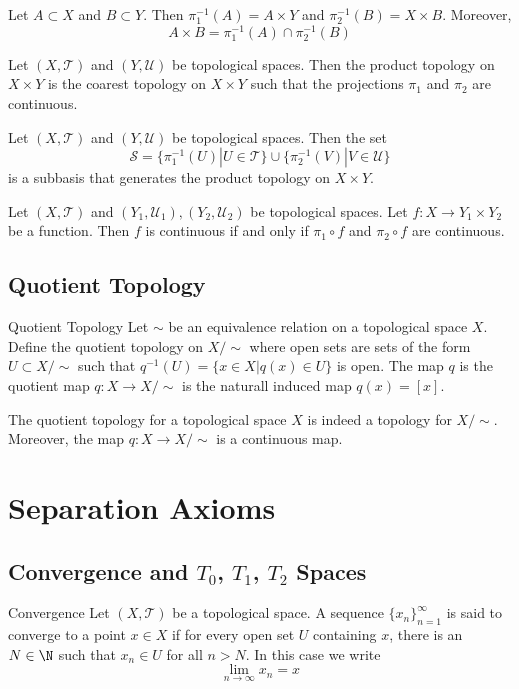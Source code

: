\begin{prp}{}{} Let $A\subset X$ and $B\subset Y$. Then $\pi_1^{-1}(A)=A\times Y$ and $\pi_2^{-1}(B)=X\times B$. Moreover, $$A\times B=\pi_1^{-1}(A)\cap\pi_2^{-1}(B)$$
\end{prp}

\begin{prp}{}{} Let $(X,\mathcal{T})$ and $(Y,\mathcal{U})$ be topological spaces. Then the product topology on $X\times Y$ is the coarest topology on $X\times Y$ such that the projections $\pi_1$ and $\pi_2$ are continuous. 
\end{prp}

\begin{prp}{}{} Let $(X,\mathcal{T})$ and $(Y,\mathcal{U})$ be topological spaces. Then the set $$\mathcal{S}=\{\pi_1^{-1}(U)|U\in\mathcal{T}\}\cup\{\pi_2^{-1}(V)|V\in\mathcal{U}\}$$ is a subbasis that generates the product topology on $X\times Y$. 
\end{prp}

\begin{prp}{}{} Let $(X,\mathcal{T})$ and $(Y_1,\mathcal{U}_1),(Y_2,\mathcal{U}_2)$ be topological spaces. Let $f:X\to Y_1\times Y_2$ be a function. Then $f$ is continuous if and only if $\pi_1\circ f$ and $\pi_2\circ f$ are continuous. 
\end{prp}

\subsection{Quotient Topology}
\begin{defn}{Quotient Topology}{} Let $\sim$ be an equivalence relation on a topological space $X$. Define the quotient topology on $X/\sim$ where open sets are sets of the form $U\subset X/\sim$ such that $q^{-1}(U)=\{x\in X|q(x)\in U\}$ is open. The map $q$ is the quotient map $q:X\to X/\sim$ is the naturall induced map $q(x)=[x]$. 
\end{defn}

\begin{prp}{}{} The quotient topology for a topological space $X$ is indeed a topology for $X/\sim$. Moreover, the map $q:X\to X/\sim$ is a continuous map. 
\end{prp}

\pagebreak
\section{Separation Axioms}
\subsection{Convergence and $T_0$, $T_1$, $T_2$ Spaces}
\begin{defn}{Convergence}{} Let $(X,\mathcal{T})$ be a topological space. A sequence $\{x_n\}_{n=1}^\infty$ is said to converge to a point $x\in X$ if for every open set $U$ containing $x$, there is an $N\in\N$ such that $x_n\in U$ for all $n>N$. In this case we write $$\lim_{n\to\infty}x_n=x$$
\end{defn}

